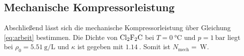 \subsection{Mechanische Kompressorleistung}
Abschließend lässt sich die mechanische Kompressorleistung über Gleichung \eqref{eq:arbeit} bestimmen.
Die Dichte von $\ce{Cl2F2C}$ bei $T=\SI{0}{\celsius}$ und $p=\SI{1}{\bar}$ liegt bei $\rho_0=\SI{5.51}{\gram\per\liter}$ und
$\kappa$ ist gegeben mit $\SI{1.14}{}$.
Somit ist $N_\text{mech}=\SI{}{\watt}$.
%
